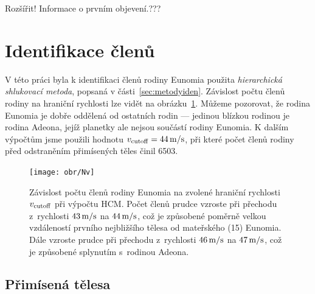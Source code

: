 \documentclass[A4paper, 12pt, oneside]{book}
\begin{document}
Rozšířit! Informace o prvním objevení.???

\section{Identifikace členů}

V této práci byla k identifikaci členů rodiny Eunomia použita \textit{hierarchická shlukovací metoda}, popsaná v části~\ref{sec:metodyiden}. Závislost počtu členů rodiny na hraniční rychlosti lze vidět na obrázku~\ref{fig:Nv}. Můžeme pozorovat, že rodina Eunomia je dobře oddělená od ostatních rodin --- jedinou blízkou rodinou je rodina Adeona, jejíž planetky ale nejsou součástí rodiny Eunomia. K dalším výpočtům jsme použili hodnotu $v_{\rm cutoff}=44\,{\rm m/s}$, při které počet členů rodiny před odstraněním přimísených těles činil 6503.

\begin{figure}
	\centering
	\texttt{[image: obr/Nv]}
	\caption{Závislost počtu členů rodiny Eunomia na zvolené hraniční rychlosti $v_{\rm cutoff}$ při výpočtu HCM\@. Počet členů prudce vzroste při přechodu z~rychlosti $43\,{\rm m/s}$ na $44\,{\rm m/s}$, což je způsobené poměrně velkou vzdáleností prvního nejbližšího tělesa od mateřského (15) Eunomia. Dále vzroste prudce při přechodu z~rychlosti $46\,{\rm m/s}$ na $47\,{\rm m/s}$, což je způsobené splynutím s~rodinou Adeona.}
	\label{fig:Nv}
\end{figure}

\subsection{Přimísená tělesa} \label{sec:interlopers}
\end{document}
